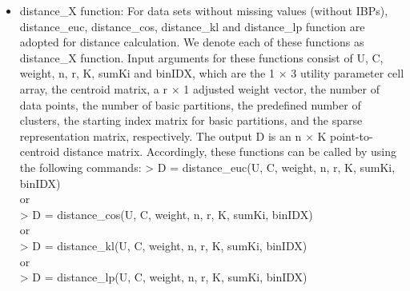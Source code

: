 \documentclass[acmsmall,screen,review]{acmart}
\begin{document}
\begin{itemize}
\item \textsf{distance\_X} function: For data sets without missing values (without IBPs), \textsf{distance\_euc}, \textsf{distance\_cos}, \textsf{distance\_kl} and \textsf{distance\_lp} function are adopted for distance calculation. We denote each of these functions as \textsf{distance\_X} function. Input arguments for these functions consist of \textsf{U}, \textsf{C}, \textsf{weight}, \textsf{n}, \textsf{r}, \textsf{K}, \textsf{sumKi} and \textsf{binIDX}, which are the \textsf{1} $\times$ \textsf{3} utility parameter cell array, the centroid matrix, a \textsf{r} $\times$ \textsf{1} adjusted weight vector, the number of data points, the number of basic partitions, the predefined number of clusters, the starting index matrix for basic partitions, and the sparse representation matrix, respectively. The output \textsf{D} is an \textsf{n} $\times$ \textsf{K} point-to-centroid distance matrix. Accordingly, these functions can be called by using the following commands:
\newline
\newline
\textsf{> D = distance\_euc(U, C, weight, n, r, K, sumKi, binIDX)}\\
or \\
\textsf{> D = distance\_cos(U, C, weight, n, r, K, sumKi, binIDX)} \\
or \\
\textsf{> D = distance\_kl(U, C, weight, n, r, K, sumKi, binIDX)} \\
or \\
\textsf{> D = distance\_lp(U, C, weight, n, r, K, sumKi, binIDX)} \\


\end{itemize}
\end{document}
